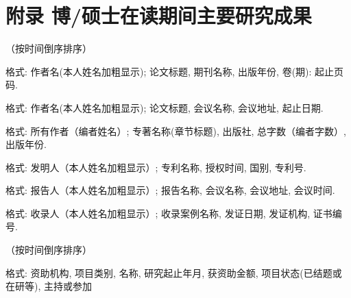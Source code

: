 \chapter*{附录 博/硕士在读期间主要研究成果}

（按时间倒序排序）


格式: 作者名(本人姓名加粗显示); 论文标题, 期刊名称, 出版年份, 卷(期): 起止页码.


格式: 作者名(本人姓名加粗显示); 论文标题, 会议名称, 会议地址, 起止日期.


格式: 所有作者（编者姓名）; 专著名称(章节标题), 出版社, 总字数（编者字数）, 出版年份.


格式: 发明人（本人姓名加粗显示）; 专利名称, 授权时间, 国别, 专利号.


格式: 报告人（本人姓名加粗显示）; 报告名称, 会议名称, 会议地址, 会议时间.


格式: 收录人（本人姓名加粗显示）; 收录案例名称, 发证日期, 发证机构, 证书编号.

\vspace{2em}
（按时间倒序排序）

格式: 资助机构, 项目类别, 名称, 研究起止年月, 获资助金额, 项目状态(已结题或在研等), 主持或参加
